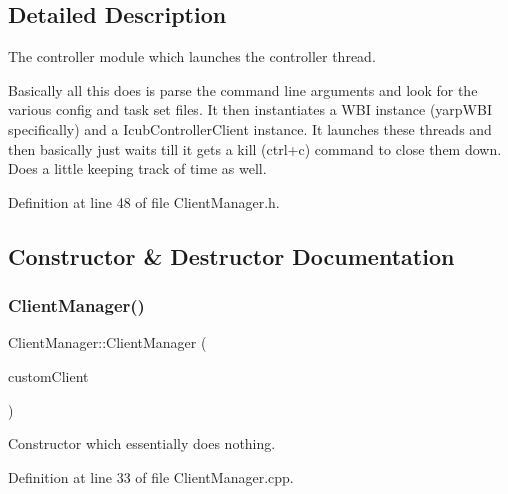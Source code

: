 \subsection{Detailed Description}
The controller module which launches the controller thread. 

Basically all this does is parse the command line arguments and look for the various config and task set files. It then instantiates a W\+BI instance (yarp\+W\+BI specifically) and a Icub\+Controller\+Client instance. It launches these threads and then basically just waits till it gets a kill (ctrl+c) command to close them down. Does a little keeping track of time as well. 

Definition at line 48 of file Client\+Manager.\+h.



\subsection{Constructor \& Destructor Documentation}
\hypertarget{classocra__recipes_1_1ClientManager_ad5e77797451b303bf063ca6c1ebf8307}{}\label{classocra__recipes_1_1ClientManager_ad5e77797451b303bf063ca6c1ebf8307} 
\subsubsection{\texorpdfstring{Client\+Manager()}{ClientManager()}}
{\footnotesize\ttfamily Client\+Manager\+::\+Client\+Manager (\begin{DoxyParamCaption}\item[{std\+::shared\+\_\+ptr$<$ \hyperlink{classocra__recipes_1_1ControllerClient}{Controller\+Client} $>$}]{custom\+Client }\end{DoxyParamCaption})}

Constructor which essentially does nothing. 

Definition at line 33 of file Client\+Manager.\+cpp.

\hypertarget{classocra__recipes_1_1ClientManager_af605d4fa9dab04b9874bf307277cd8a3}{}\label{classocra__recipes_1_1ClientManager_af605d4fa9dab04b9874bf307277cd8a3} 
